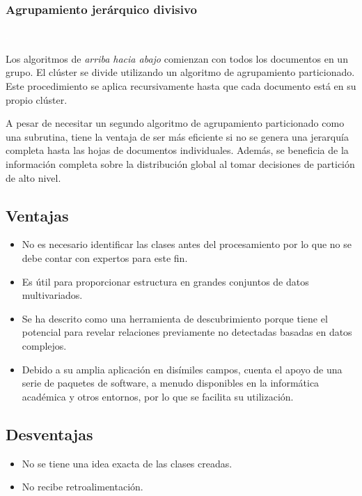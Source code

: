 \documentclass{llncs}
\begin{document}
\subsubsection{Agrupamiento jer\'arquico divisivo}

\textcolor{white}{.}

\vspace{0.5em}
Los algoritmos de \textit{arriba hacia abajo} comienzan con todos los documentos en un grupo. El clúster se divide utilizando un algoritmo de agrupamiento particionado. Este procedimiento se aplica recursivamente hasta que cada documento está en su
propio clúster.

A pesar de necesitar un segundo algoritmo de agrupamiento particionado como una subrutina, tiene la ventaja de ser más eficiente si no se genera una jerarquía completa hasta las hojas de documentos individuales. Adem\'as, se beneficia de la información completa sobre la distribución global al tomar decisiones de partición de alto nivel.

\subsection{Ventajas} 

\begin{itemize}
	\item No es necesario identificar las clases antes del procesamiento por lo que no se debe contar con expertos para este fin.
	
	\item Es útil para proporcionar estructura en grandes conjuntos de datos multivariados.
	
	\item Se ha descrito como una herramienta de descubrimiento porque tiene el potencial para revelar relaciones previamente no detectadas basadas en datos complejos.
	
	\item Debido a su amplia aplicación en dis\'imiles campos, cuenta el apoyo de una serie de paquetes de software, a menudo disponibles en la informática académica y otros entornos, por lo que se facilita su utilizaci\'on.
\end{itemize}

\subsection{Desventajas} 
	\begin{itemize}
		\item No se tiene una idea exacta de las clases creadas.
		\item No recibe retroalimentaci\'on.
	\end{itemize}
\end{document}
